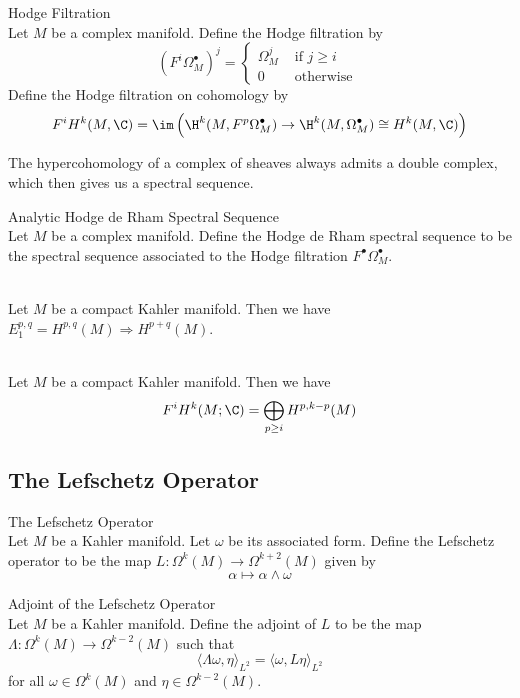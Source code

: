 \documentclass[a4paper]{article}
\begin{document}
\begin{defn}{Hodge Filtration}{}\\
Let $M$ be a complex manifold. Define the Hodge filtration by $$(F^i\Omega_M^\bullet)^j=\begin{cases}
\Omega_M^j & \text{ if }j\geq i\\
0 & \text{ otherwise }
\end{cases}$$
Define the Hodge filtration on cohomology by $$F^iH^k(M,\C)=\im\left(\H^k(M,F^p\Omega_M^\bullet)\to\H^k(M,\Omega_M^\bullet)\cong H^k(M,\C)\right)$$
\end{defn}

The hypercohomology of a complex of sheaves always admits a double complex, which then gives us a spectral sequence. 

\begin{defn}{Analytic Hodge de Rham Spectral Sequence}{}\\
Let $M$ be a complex manifold. Define the Hodge de Rham spectral sequence to be the spectral sequence associated to the Hodge filtration $F^\bullet\Omega_M^\bullet$. 
\end{defn}

\begin{prp}{}{}\\
Let $M$ be a compact Kahler manifold. Then we have $E_1^{p,q}=H^{p,q}(M)\Rightarrow H^{p+q}(M)$. 
\end{prp}

\begin{crl}{}{}\\
Let $M$ be a compact Kahler manifold. Then we have $$F^iH^k(M;\C)=\bigoplus_{p\geq i}H^{p,k-p}(M)$$
\end{crl}

\subsection{The Lefschetz Operator}
\begin{defn}{The Lefschetz Operator}{}\\
Let $M$ be a Kahler manifold. Let $\omega$ be its associated form. Define the Lefschetz operator to be the map $L:\Omega^k(M)\to\Omega^{k+2}(M)$ given by $$\alpha\mapsto\alpha\wedge\omega$$
\end{defn}

\begin{defn}{Adjoint of the Lefschetz Operator}{}\\
Let $M$ be a Kahler manifold. Define the adjoint of $L$ to be the map $\Lambda:\Omega^k(M)\to\Omega^{k-2}(M)$ such that $$\langle\Lambda\omega,\eta\rangle_{L^2}=\langle\omega, L\eta\rangle_{L^2}$$ for all $\omega\in\Omega^k(M)$ and $\eta\in\Omega^{k-2}(M)$. 
\end{defn}
\end{document}
